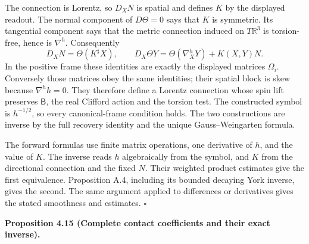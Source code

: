 \documentclass[
  english,
  11pt,
  reqno]{amsart}
\makeatletter
\newcommand{\pandocstatementheading}[1]{%
  \par\if@nobreak\else
    \addpenalty{\@beginparpenalty}%
    \addvspace{.5\baselineskip plus .2\baselineskip minus .2\baselineskip}%
  \fi
  {\normalfont\bfseries #1\par}%
  \nobreak\@afterindenttrue\@afterheading
}
\makeatother
\begin{document}
The connection is Lorentz, so \(D_XN\) is spatial and defines \(K\) by
the displayed readout. The normal component of \(D\Theta=0\) says that
\(K\) is symmetric. Its tangential component says that the metric
connection induced on \(T\mathbb R^3\) is torsion-free, hence is
\(\nabla^h\). Consequently%
 \[
D_XN=\Theta(K^\sharp X),\qquad
D_X\Theta Y=\Theta(\nabla_X^hY)+K(X,Y)N.
\] In the positive frame these identities are exactly the displayed
matrices \(\Omega_i\). Conversely those matrices obey the same
identities; their spatial block is skew because \(\nabla^h h=0\). They
therefore define a Lorentz connection whose spin lift preserves
\(\mathsf B\), the real Clifford action and the torsion test. The
constructed symbol is \(h^{-1/2}\), so every canonical-frame condition
holds. The two constructions are inverse by the full recovery identity
and the unique Gauss--Weingarten formula.

The forward formulas use finite matrix operations, one derivative of
\(h\), and the value of \(K\). The inverse reads \(h\) algebraically
from the symbol, and \(K\) from the directional connection and the fixed
\(N\). Their weighted product estimates give the first equivalence.
Proposition A.4, including its bounded decaying York inverse, gives the
second. The same argument applied to differences or derivatives gives
the stated smoothness and estimates. \hfill\(\square\)

\pandocstatementheading{\leavevmode{}\label{prop:online-contact-complete-kinematic-codec}Proposition 4.15 (Complete contact coefficients and their exact
inverse).}
\end{document}
